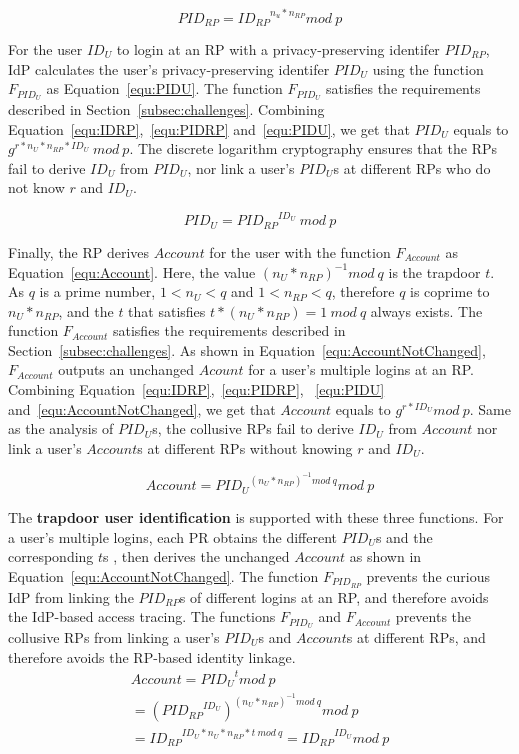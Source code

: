  \begin{equation}
    PID_{RP} = {ID_{RP}}^{n_{u}* n_{RP}} mod \ p
   \label{equ:PIDRP}
   \end{equation}

For the user $ID_U$ to login at an RP with a privacy-preserving identifer $PID_{RP}$, IdP calculates the user's privacy-preserving identifer $PID_U$ using the function  $F_{PID_{U}}$ as Equation~\ref{equ:PIDU}. The function $F_{PID_{U}}$ satisfies the requirements described in Section~\ref{subsec:challenges}. 
Combining Equation~\ref{equ:IDRP},~\ref{equ:PIDRP} and~\ref{equ:PIDU}, we get that  $PID_U$ equals to $g^{r*n_U*n_{RP}*ID_U}\ mod \ p$.
The discrete logarithm cryptography ensures that the RPs fail to derive $ID_U$ from $PID_U$,
nor link a user's $PID_U$s at different RPs who do not know $r$ and $ID_U$.

   
\begin{equation}
 PID_U = {PID_{RP}}^{ID_U} \ mod \ p
 \label{equ:PIDU}
\end{equation}

Finally, the RP derives $Account$ for the user with the function $F_{Account}$ as Equation~\ref{equ:Account}. Here, the value $(n_U*n_{RP})^{-1} mod \ q$ is the trapdoor $t$. As $q$ is a prime number, $1< n_U < q$ and $1< n_{RP} < q$, therefore $q$ is coprime to $n_U*n_{RP}$, and the $t$ that satisfies $t*(n_U*n_{RP}) = 1\ mod \ q$ always exists. The function $F_{Account}$ satisfies the requirements described in Section~\ref{subsec:challenges}.  As shown in Equation~\ref{equ:AccountNotChanged},  $F_{Account}$ outputs an unchanged $Acount$ for a user's multiple logins at an RP. 
Combining Equation~\ref{equ:IDRP},~\ref{equ:PIDRP}, ~\ref{equ:PIDU} and~\ref{equ:AccountNotChanged}, we get that $Account$ equals to $g^{r*ID_U} mod \ p$.
Same as the analysis of $PID_U$s, the collusive RPs fail to derive $ID_U$ from $Account$ nor link a user's $Account$s at different RPs without knowing $r$ and $ID_U$.

 \begin{equation}
   Account = {PID_U}^{(n_U*n_{RP})^{-1} mod \ q} mod \ p
   \label{equ:Account}
   \end{equation}

The \textbf{trapdoor user identification} is supported with these three functions.
For a user's multiple logins, each PR obtains the different $PID_U$s and the corresponding $t$s , then derives the unchanged $Account$  as shown in Equation~\ref{equ:AccountNotChanged}.
The function $F_{PID_{RP}}$ prevents the curious IdP from linking the $PID_{RP}$s of different logins at an RP, and therefore avoids  the  IdP-based access tracing.
The functions $F_{PID_{U}}$ and $F_{Account}$ prevents the collusive RPs from linking a user's $PID_U$s and $Account$s at different RPs, and therefore avoids the RP-based identity linkage.
 \begin{multline}\label{equ:AccountNotChanged}
   Account =  {PID_{U}}^{t} mod \ p  \\
   = {({PID_{RP}}^{ID_U})}^{{(n_U*n_{RP})^{-1} mod \ q}} mod \ p \\
   = {ID_{RP}} ^ {ID_U * n_U * n_{RP} *t\ mod\ q} = {ID_{RP}}^{ID_U} mod \ p
 \end{multline}

